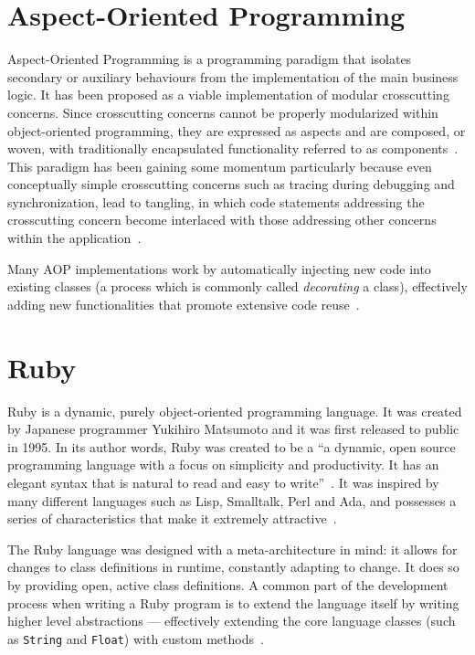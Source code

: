 \section{Aspect-Oriented Programming}\label{sec:aspect_oriented_programming}

Aspect-Oriented Programming is a programming paradigm that isolates secondary or auxiliary behaviours from the implementation of the main business logic. It has been proposed as a viable implementation of modular crosscutting concerns. Since crosscutting concerns cannot be properly modularized within object-oriented programming, they are expressed as aspects and are composed, or woven, with traditionally encapsulated functionality referred to as components~\cite{KM05, Ste06}. This paradigm has been gaining some momentum particularly because even conceptually simple crosscutting concerns such as tracing during debugging and synchronization, lead to tangling, in which code statements addressing the crosscutting concern become interlaced with those addressing other concerns within the application~\cite{LC03}.

Many AOP implementations work by automatically injecting new code into existing classes (a process which is commonly called \emph{decorating} a class), effectively adding new functionalities that promote extensive code reuse~\cite{Ste06, LC03, metaclass_programming_in_python}.

\section{Ruby}\label{sec:ruby}

Ruby is a dynamic, purely object-oriented programming language. It was created by Japanese programmer Yukihiro Matsumoto and it was first released to public in 1995. In its author words, Ruby was created to be a ``a dynamic, open source programming language with a focus on simplicity and productivity. It has an elegant syntax that is natural to read and easy to write''~\cite{ruby}. It was inspired by many different languages such as Lisp, Smalltalk, Perl and Ada, and possesses a series of characteristics that make it extremely attractive~\cite{ruby}.

The Ruby language was designed with a meta-architecture in mind: it allows for changes to class definitions in runtime, constantly adapting to change. It does so by providing open, active class definitions. A common part of the development process when writing a Ruby program is to extend the language itself by writing higher level abstractions --- effectively extending the core language classes (such as \verb!String! and \verb!Float!) with custom methods~\cite{metaprogramming_ruby}.

